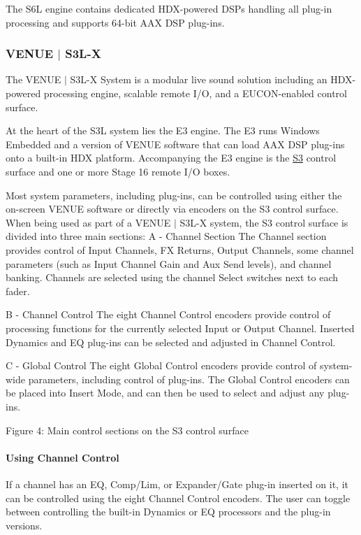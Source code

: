  The S6L engine contains dedicated H\+D\+X-\/powered D\+S\+Ps handling all plug-\/in processing and supports 64-\/bit A\+AX D\+SP plug-\/ins.

\hypertarget{a00849_aax_venue_guide__systems__s3l}{}\subsubsection{V\+E\+N\+U\+E $\vert$ S3\+L-\/X}\label{a00849_aax_venue_guide__systems__s3l}
 The V\+E\+N\+UE $\vert$ S3\+L-\/X System is a modular live sound solution including an H\+D\+X-\/powered processing engine, scalable remote I/O, and a E\+U\+C\+O\+N-\/enabled control surface.

 At the heart of the S3L system lies the E3 engine. The E3 runs Windows Embedded and a version of V\+E\+N\+UE software that can load A\+AX D\+SP plug-\/ins onto a built-\/in H\+DX platform. Accompanying the E3 engine is the \mbox{\hyperlink{a00833_subsubsection__avid_s3}{S3}} control surface and one or more Stage 16 remote I/O boxes.

 Most system parameters, including plug-\/ins, can be controlled using either the on-\/screen V\+E\+N\+UE software or directly via encoders on the S3 control surface. When being used as part of a V\+E\+N\+UE $\vert$ S3\+L-\/X system, the S3 control surface is divided into three main sections\+: A -\/ Channel Section The Channel section provides control of Input Channels, FX Returns, Output Channels, some channel parameters (such as Input Channel Gain and Aux Send levels), and channel banking. Channels are selected using the channel Select switches next to each fader.

 B -\/ Channel Control The eight Channel Control encoders provide control of processing functions for the currently selected Input or Output Channel. Inserted Dynamics and EQ plug-\/ins can be selected and adjusted in Channel Control.

 C -\/ Global Control The eight Global Control encoders provide control of system-\/wide parameters, including control of plug-\/ins. The Global Control encoders can be placed into Insert Mode, and can then be used to select and adjust any plug-\/ins.

  Figure 4\+: Main control sections on the S3 control surface

\hypertarget{a00849_aax_venue_guide__systems__s3l__using_channel_control}{}\paragraph{Using Channel Control}\label{a00849_aax_venue_guide__systems__s3l__using_channel_control}
 If a channel has an EQ, Comp/\+Lim, or Expander/\+Gate plug-\/in inserted on it, it can be controlled using the eight Channel Control encoders. The user can toggle between controlling the built-\/in Dynamics or EQ processors and the plug-\/in versions.

